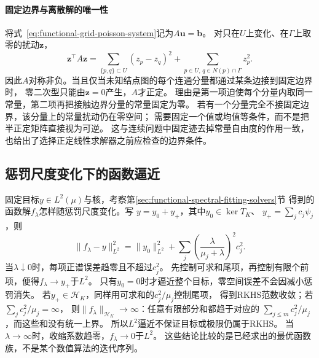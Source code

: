 \paragraph{固定边界与离散解的唯一性}
将式~\eqref{eq:functional-grid-poisson-system}记为$A\bm u=\bm b$。
对只在$U$上变化、在$\Gamma$上取零的扰动$\bm z$，
\[
 \bm z^\top A\bm z
 =\sum_{\{p,q\}\subset U}(z_p-z_q)^2
   +\sum_{p\in U,\,q\in N(p)\cap\Gamma}z_p^2.
\]
因此$A$对称非负。当且仅当未知结点图的每个连通分量都通过某条边接到固定边界时，
零二次型只能由$\bm z=0$产生，$A$才正定。
理由是第一项迫使每个分量内取同一常量，第二项再把接触边界分量的常量固定为零。
若有一个分量完全不接固定边界，该分量上的常量扰动仍在零空间；
需要固定一个值或均值等条件，而不是把半正定矩阵直接视为可逆。
这与连续问题中固定迹去掉常量自由度的作用一致，
也给出了选择正定线性求解器之前应检查的边界条件。

\subsection{惩罚尺度变化下的函数逼近}
\label{sec:functional-penalty-scale-approximation}

固定目标$y\in L^2(\mu)$与核，考察第\ref{sec:functional-spectral-fitting-solvers}节
得到的函数解$f_\lambda$怎样随惩罚尺度变化。写
$y=y_0+y_+$，其中$y_0\in\ker T_K$、
$y_+=\sum_jc_j\psi_j$，则
\[
 \lVert f_\lambda-y\rVert_{L^2}^2
 =\lVert y_0\rVert_{L^2}^2+
   \sum_j\left(\frac{\lambda}{\mu_j+\lambda}\right)^2c_j^2.
\]
当$\lambda\downarrow0$时，每项正谱误差趋零且不超过$c_j^2$。
先控制可求和尾项，再控制有限个前项，便得$f_\lambda\to y_+$于$L^2$。
只有$y_0=0$时才逼近整个目标，零空间误差不会因减小惩罚消失。
若$y_+\in\mathcal H_K$，同样用可求和的$c_j^2/\mu_j$控制尾项，
得到RKHS范数收敛；若$\sum_jc_j^2/\mu_j=\infty$，
则$\lVert f_\lambda\rVert_{\mathcal H_K}\to\infty$：任意有限部分和都趋于对应的
$\sum_{j\leq m}c_j^2/\mu_j$，而这些和没有统一上界。
所以$L^2$逼近不保证目标或极限仍属于RKHS。
当$\lambda\to\infty$时，收缩系数趋零，$f_\lambda\to0$于$L^2$。
这些结论比较的是已经求出的最优函数族，不是某个数值算法的迭代序列。

